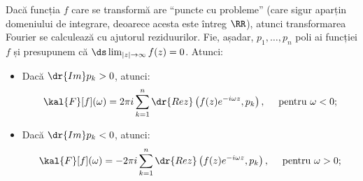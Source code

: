 Dacă funcția $ f $ care se transformă are \enquote{puncte cu probleme}
(care sigur aparțin domeniului de integrare, deoarece acesta este întreg
$ \RR $), atunci transformarea Fourier se calculează cu ajutorul reziduurilor.
Fie, așadar, $ p_1, \dots, p_n $ poli ai funcției $ f $ și presupunem că
$ \ds\lim_{|z| \to \infty} f(z) = 0 $. Atunci:
\begin{itemize}
    \item Dacă $ \dr{Im}p_k > 0 $, atunci:
        \[
            \kal{F}[f](\omega) = 2\pi i \sum_{k=1}^n \dr{Rez}\left(f(z)e^{-i\omega z}, p_k\right), %
            \quad \text{ pentru } \omega < 0;
        \]
    \item Dacă $ \dr{Im}p_k < 0 $, atunci:
        \[
            \kal{F}[f](\omega) = -2\pi i \sum_{k=1}^n \dr{Rez}\left(f(z)e^{-i\omega z}, p_k\right), %
            \quad \text{ pentru } \omega > 0;
        \]
\end{itemize}

